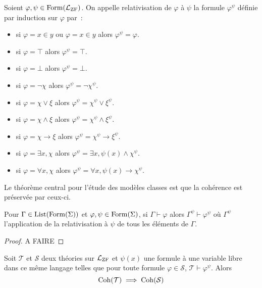 \begin{definition}
  Soient $\varphi,\psi\in\operatorname{Form}(\mathcal L_{\operatorname{ZF}})$. On appelle relativisation
  de $\varphi$ à $\psi$ la formule $\varphi^\psi$ définie par induction sur
  $\varphi$ par~:
  \begin{itemize}
  \item si $\varphi = x \in y$ ou $\varphi = x \in y$ alors
    $\varphi^\psi = \varphi$.
  \item si $\varphi = \top$ alors $\varphi^\psi = \top$.
  \item si $\varphi = \bot$ alors $\varphi^\psi = \bot$.
  \item si $\varphi = \lnot \chi$ alors $\varphi^\psi = \lnot \chi^\psi$.
  \item si $\varphi = \chi \lor \xi$ alors
    $\varphi^\psi = \chi^\psi \lor \xi^\psi$.
  \item si $\varphi = \chi \land \xi$ alors
    $\varphi^\psi = \chi^\psi \land \xi^\psi$.
  \item si $\varphi = \chi \to \xi$ alors
    $\varphi^\psi = \chi^\psi \to \xi^\psi$.
  \item si $\varphi = \exists x, \chi$ alors
    $\varphi^\psi = \exists x, \psi(x) \land \chi^\psi$.
  \item si $\varphi = \forall x, \chi$ alors
    $\varphi^\psi = \forall x, \psi(x) \to \chi^\psi$.
  \end{itemize}
\end{definition}

Le théorème central pour l'étude des modèles classes est que la cohérence est
préservée par ceux-ci.

\begin{lemma}
  Pour $\Gamma\in\operatorname{List}(\operatorname{Form}(\Sigma))$ et $\varphi,\psi\in\operatorname{Form}(\Sigma)$,
  si $\Gamma\vdash \varphi$ alors $\Gamma^\psi \vdash \varphi^\psi$ où
  $\Gamma^\psi$ l'application de la relativisation à $\psi$ de tous les éléments
  de $\Gamma$.
\end{lemma}

\begin{proof}
  A FAIRE
\end{proof}

\begin{theorem}
  Soit $\mathcal T$ et $\mathcal S$ deux théories sur $\mathcal L_{\operatorname{ZF}}$ et
  $\psi(x)$ une formule à une variable libre dans ce même langage telles que
  pour toute formule
  $\varphi \in \mathcal S$, $\mathcal T\vdash \varphi^\psi$. Alors
  \[\operatorname{Coh}(\mathcal T) \implies \operatorname{Coh}(\mathcal S)\]
\end{theorem}

